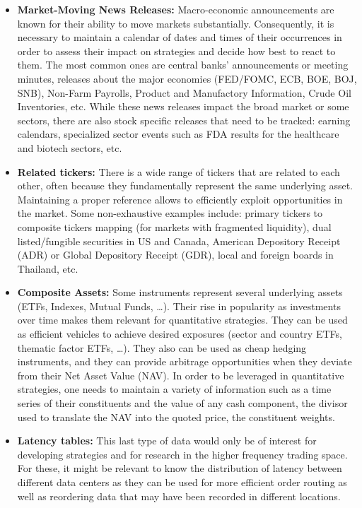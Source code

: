 \begin{itemize}
\item \textbf{Market-Moving News Releases:} Macro-economic announcements are known for their ability to move markets substantially. Consequently, it is necessary to maintain a calendar of dates and times of their occurrences in order to assess their impact on strategies and decide how best to react to them. The most common ones are central banks' announcements or meeting minutes, releases about the major economies (FED/FOMC, ECB, BOE, BOJ, SNB), Non-Farm Payrolls, Product and Manufactory Information, Crude Oil Inventories, etc. While these news releases impact the broad market or some sectors, there are also stock specific releases that need to be tracked: earning calendars, specialized sector events such as FDA results for the healthcare and biotech sectors, etc.


\item \textbf{Related tickers:} There is a wide range of tickers that are related to each other, often because they fundamentally represent the same underlying asset. Maintaining a proper reference allows to efficiently exploit opportunities in the market. Some non-exhaustive examples include: primary tickers to composite tickers mapping (for markets with fragmented liquidity), dual listed/fungible securities in US and Canada, American Depository Receipt (ADR) or Global Depository Receipt (GDR), local and foreign boards in Thailand, etc.


\item \textbf{Composite Assets:} Some instruments represent several underlying assets (ETFs, Indexes, Mutual Funds, \dots). Their rise in popularity as investments over time makes them relevant for quantitative strategies. They can be used as efficient vehicles to achieve desired exposures (sector and country ETFs, thematic factor ETFs, \dots). They also can be used as cheap hedging instruments, and they can provide arbitrage opportunities when they deviate from their Net Asset Value (NAV). 
In order to be leveraged in quantitative strategies, one needs to maintain a variety of information such as a time series of their constituents and the value of any cash component, the divisor used to translate the NAV into the quoted price, the constituent weights. 


\item \textbf{Latency tables:} This last type of data would only be of interest for developing strategies and for research in the higher frequency trading space. For these, it might be relevant to know the distribution of latency between different data centers as they can be used for more efficient order routing as well as reordering data that may have been recorded in different locations.
\end{itemize}


